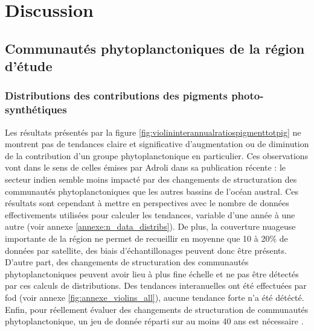 \chapter{Discussion}

\section{Communautés phytoplanctoniques de la région d'étude}
\subsection{Distributions des contributions des pigments photo-synthétiques}
Les résultats présentés par la figure \ref{fig:violininterannualratiospigmenttotpig} ne montrent pas de tendances claire et significative d'augmentation ou de diminution de la contribution d'un groupe phytoplanctonique en particulier. Ces observations vont dans le sens de celles émises par Adroli dans sa publication récente \cite{adroli2026} : le secteur indien semble moins impacté par des changements de structuration des communautés phytoplanctoniques que les autres bassins de l'océan austral. Ces résultats sont cependant à mettre en perspectives avec le nombre de données effectivements utilisées pour calculer les tendances, variable d'une année à une autre (voir annexe \ref{annexe:n_data_distribs}). De plus, la couverture nuageuse importante de la région ne permet de recueillir en moyenne que 10 à 20\% de données par satellite, des biais d'échantillonages peuvent donc être présents. D'autre part, des changements de structuration des communautés phytoplanctoniques peuvent avoir lieu à plus fine échelle et ne pas être détectés par ces calculs de distributions. Des tendances interanuelles ont été effectuées par fod (voir annexe \ref{fig:annexe_violins_all}), aucune tendance forte n'a été détécté. Enfin, pour réellement évaluer des changements de structuration de communautés phytoplanctonique, un jeu de donnée réparti sur au moins 40 ans est nécessaire \cite{thomalla2023Widespread}.


